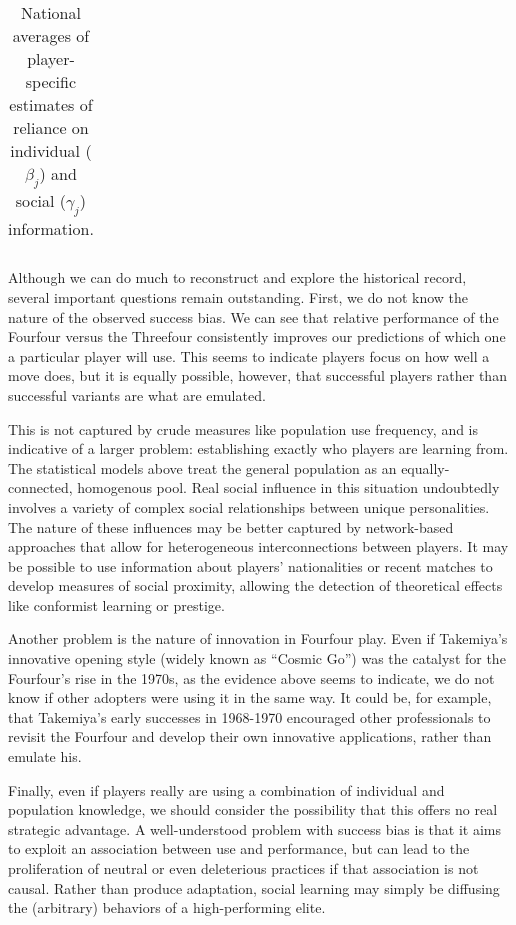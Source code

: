 \documentclass[reqno,12pt]{amsart}
\begin{document}
\begin{table}[t]
  \centering
    \begin{tabular}{lrrrrr}
    
    \end{tabular}%
    \caption{National averages of player-specific estimates of reliance on individual ($\beta_j$) and social ($\gamma_j$) information.}
\end{table}

Although we can do much to reconstruct and explore the historical
record, several important questions remain outstanding. First, we do not
know the nature of the observed success bias. We can see that relative
performance of the Fourfour versus the Threefour consistently improves
our predictions of which one a particular player will use. This seems to
indicate players focus on how well a move does, but it is equally
possible, however, that successful players rather than successful
variants are what are emulated.

This is not captured by crude measures like population use frequency,
and is indicative of a larger problem: establishing exactly who players
are learning from. The statistical models above treat the general
population as an equally-connected, homogenous pool. Real social
influence in this situation undoubtedly involves a variety of complex
social relationships between unique personalities. The nature of these
influences may be better captured by network-based approaches that allow
for heterogeneous interconnections between players. It may be possible
to use information about players' nationalities or recent matches to
develop measures of social proximity, allowing the detection of
theoretical effects like conformist learning or prestige.

Another problem is the nature of innovation in Fourfour play. Even if
Takemiya's innovative opening style (widely known as ``Cosmic Go'') was
the catalyst for the Fourfour's rise in the 1970s, as the evidence above
seems to indicate, we do not know if other adopters were using it in the
same way. It could be, for example, that Takemiya's early successes in
1968-1970 encouraged other professionals to revisit the Fourfour and
develop their own innovative applications, rather than emulate his.

Finally, even if players really are using a combination of individual
and population knowledge, we should consider the possibility that this
offers no real strategic advantage. A well-understood problem with
success bias is that it aims to exploit an association between use and
performance, but can lead to the proliferation of neutral or even
deleterious practices if that association is not causal. Rather than
produce adaptation, social learning may simply be diffusing the
(arbitrary) behaviors of a high-performing elite.
\end{document}
